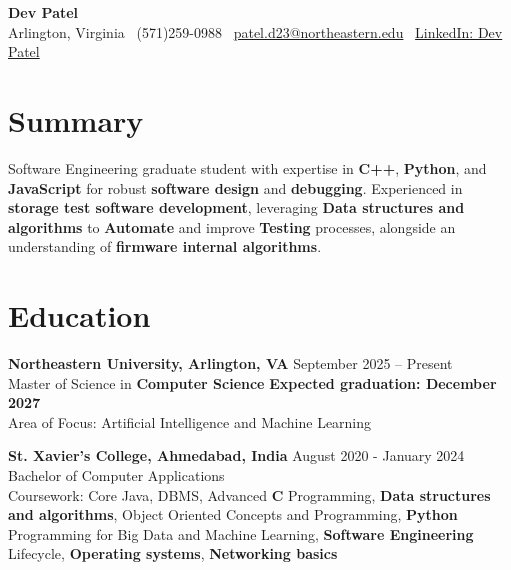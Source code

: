 \documentclass[a4paper,10pt]{article}
\begin{document}
\begin{center}
\vspace{-3mm}
    \fontsize{16}{18}\selectfont \textbf{Dev Patel} \\
    \vspace{0mm}
    \normalsize Arlington, Virginia \textbar\ (571)259-0988  \textbar\       \href{mailto:patel.d23@northeastern.edu}{patel.d23@northeastern.edu} \textbar\ \href{https://www.linkedin.com/in/devxpatel//}{LinkedIn: Dev Patel} \\
\end{center}



\section*{Summary}
Software Engineering graduate student with expertise in \textbf{C++}, \textbf{Python}, and \textbf{JavaScript} for robust \textbf{software design} and \textbf{debugging}. Experienced in \textbf{storage test software development}, leveraging \textbf{Data structures and algorithms} to \textbf{Automate} and improve \textbf{Testing} processes, alongside an understanding of \textbf{firmware internal algorithms}.
 
\vspace{ 0 mm}
\section*{Education}
\textbf{Northeastern University, Arlington, VA} \hfill September 2025 -- Present\\
Master of Science in \textbf{Computer Science} \hfill \textbf{Expected graduation: December 2027} \\
Area of Focus: Artificial Intelligence and Machine Learning

\vspace{1 mm} %
\textbf{St. Xavier's College, Ahmedabad, India} \hfill August 2020 - January 2024 \\
Bachelor of Computer Applications\\
Coursework: Core Java, DBMS, Advanced \textbf{C} Programming, \textbf{Data structures and algorithms}, Object Oriented Concepts and Programming, \textbf{Python} Programming for Big Data and Machine Learning, \textbf{Software Engineering} Lifecycle, \textbf{Operating systems}, \textbf{Networking basics}
\end{document}
